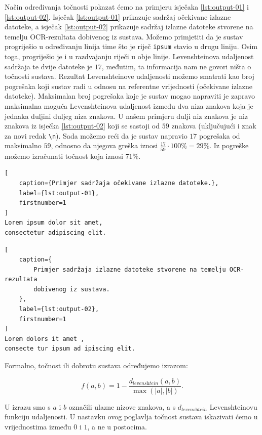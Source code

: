 \documentclass[times, utf8, zavrsni]{fer}
\begin{document}
Način određivanja točnosti pokazat ćemo na primjeru isječaka \ref{lst:output-01}
i \ref{lst:output-02}. Isječak \ref{lst:output-01} prikazuje sadržaj očekivane
izlazne datoteke, a isječak \ref{lst:output-02} prikazuje sadržaj izlazne
datoteke stvorene na temelju OCR-rezultata dobivenog iz sustava. Možemo
primjetiti da je sustav progriješio u određivanju linija time što je riječ
\lstinline{ipsum} stavio u drugu liniju. Osim toga, progriješio je i u
razdvajanju riječi u obje linije. Levenshteinova udaljenost sadržaja te
dvije datoteke je $17$, međutim, ta informacija nam ne govori ništa o točnosti
sustava. Rezultat Levenshteinove udaljenosti možemo smatrati kao broj pogrešaka
koji sustav radi u odnosu na referentne vrijednosti (očekivane izlazne
datoteke). Maksimalan broj pogrešaka koje je sustav mogao napraviti je zapravo
maksimalna moguća Levenshteinova udaljenost između dva niza znakova koja je
jednaka duljini duljeg niza znakova. U našem primjeru dulji niz znakova je niz
znakova iz isječka \ref{lst:output-02} koji se sastoji od $59$ znakova
(uključujući i znak za novi redak \lstinline{\n}). Sada možemo reći da je
sustav napravio $17$ pogrešaka od maksimalno $59$, odnosno da njegova greška
iznosi $\frac{17}{59} \cdot 100\% = 29\%$. Iz pogreške možemo izračunati točnost koja iznosi $71\%$.

\begin{lstlisting}[
    caption={Primjer sadržaja očekivane izlazne datoteke.},
    label={lst:output-01},
    firstnumber=1
]
Lorem ipsum dolor sit amet,
consectetur adipiscing elit.
\end{lstlisting}

\begin{lstlisting}[
    caption={
        Primjer sadržaja izlazne datoteke stvorene na temelju OCR-rezultata
        dobivenog iz sustava.
    },
    label={lst:output-02},
    firstnumber=1
]
Lorem dolors it amet ,
consecte tur ipsum ad ipiscing elit.
\end{lstlisting}

Formalno, točnost ili dobrotu  sustava određujemo izrazom:

\begin{equation}
\label{eq:fitness}
f(a, b) = 1 - \frac{d_\textit{levenshtein}(a, b)}{\max(|a|, |b|)} \texttt{.}
\end{equation}

U izrazu smo s $a$ i $b$ označili ulazne nizove znakova, a s
$d_\textit{levenshtein}$ Levenshteinovu funkciju udaljenosti. U nastavku ovog
poglavlja točnost sustava iskazivati ćemo u vrijednostima
između $0$ i $1$, a ne u postocima.
\end{document}
